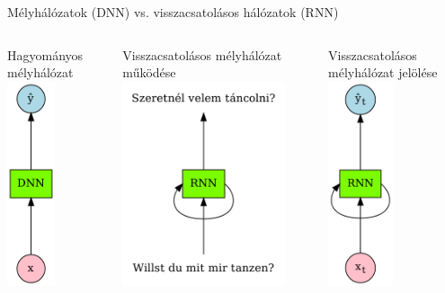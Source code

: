 \documentclass[english, aspectratio=169]{beamer}
\makeatletter
\let\origtableofcontents=\tableofcontents
\def\tableofcontents{\@ifnextchar[{\origtableofcontents}{\gobbletableofcontents}}
\def\gobbletableofcontents#1{\origtableofcontents}
\makeatother
\begin{document}
\begin{frame}
\tableofcontents[currentsection]
\end{frame}

\begin{frame}{Mélyhálózatok (DNN) vs. visszacsatolásos hálózatok (RNN)}
\begin{columns}
\begin{column}{.3\textwidth}
\begin{center}
Hagyományos mélyhálózat
\includegraphics[height=6cm, keepaspectratio]{graphs/recurrent_1.png}
\end{center}
\end{column}
\begin{column}{.3\textwidth}
\begin{center}
Visszacsatolásos mélyhálózat működése
\includegraphics[height=6cm, keepaspectratio]{graphs/recurrent_2.png}
\end{center}
\end{column}
\begin{column}{.3\textwidth}
\begin{center}
Visszacsatolásos mélyhálózat jelölése
\includegraphics[height=6cm, keepaspectratio]{graphs/recurrent_3.png}
\end{center}
\end{column}
\end{columns}
\end{frame}
\end{document}
